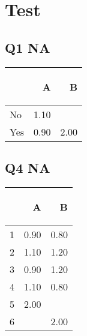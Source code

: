 \chapter{Test}

\section{Q1 NA}

\begin{tabular}{p{5cm}rr}
  \hline
 & \begin{sideways}A\end{sideways} & \begin{sideways}B\end{sideways} \\ 
  \hline
No & 1.10 &  \\ 
  Yes & 0.90 & 2.00 \\ 
   \hline
\end{tabular}
\section{Q4 NA}

\begin{tabular}{p{5cm}rr}
  \hline
 & \begin{sideways}A\end{sideways} & \begin{sideways}B\end{sideways} \\ 
  \hline
1 & 0.90 & 0.80 \\ 
  2 & 1.10 & 1.20 \\ 
  3 & 0.90 & 1.20 \\ 
  4 & 1.10 & 0.80 \\ 
  5 & 2.00 &  \\ 
  6 &  & 2.00 \\ 
   \hline
\end{tabular}
